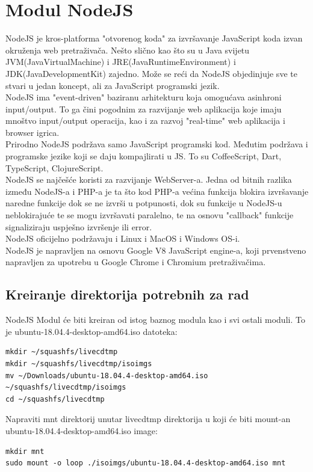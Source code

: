 \documentclass[12pt,vi]{mitthesis}
\begin{document}
\section*{Modul NodeJS}
\indent
NodeJS je kros-platforma "otvorenog koda" za izvršavanje JavaScript koda izvan okruženja web pretraživača. Nešto slično kao što su u Java svijetu JVM(JavaVirtualMachine) i JRE(JavaRuntimeEnvironment) i JDK(JavaDevelopmentKit) zajedno. Može se reći da NodeJS objedinjuje sve te stvari u jedan koncept, ali za JavaScript programski jezik.\\
NodeJS ima "event-driven" baziranu arhitekturu koja omogućava asinhroni input/output. To ga čini pogodnim za razvijanje web aplikacija koje imaju mnoštvo input/output operacija, kao i za razvoj "real-time" web aplikacija i browser igrica.\\
Prirodno NodeJS podržava samo JavaScript programski kod. Međutim podržava i programske jezike koji se daju kompajlirati u JS. To su CoffeeScript, Dart, TypeScript, ClojureScript.\\
NodeJS se najčešće koristi za razvijanje WebServer-a. Jedna od bitnih razlika između NodeJS-a i PHP-a je ta što kod PHP-a većina funkcija blokira izvršavanje naredne funkcije dok se ne izvrši u potpunosti, dok su funkcije u NodeJS-u neblokirajuće te se mogu izvršavati paralelno,  te na osnovu "callback" funkcije signaliziraju uspješno izvršenje ili error.\\
NodeJS oficijelno podržavaju i Linux i MacOS i Windows OS-i.\\
NodeJS je napravljen na osnovu Google V8 JavaScript engine-a, koji prvenstveno napravljen za upotrebu u Google Chrome i Chromium pretraživačima.

\subsection*{Kreiranje direktorija potrebnih za rad}
\noindent
NodeJS Modul će biti kreiran od istog baznog modula kao i svi ostali moduli. To je ubuntu-18.04.4-desktop-amd64.iso datoteka:
\begin{lstlisting}[style=BashInputStyle]
mkdir ~/squashfs/livecdtmp
mkdir ~/squashfs/livecdtmp/isoimgs
mv ~/Downloads/ubuntu-18.04.4-desktop-amd64.iso ~/squashfs/livecdtmp/isoimgs
cd ~/squashfs/livecdtmp
\end{lstlisting}

\noindent
Napraviti mnt direktorij unutar livecdtmp direktorija u koji će biti mount-an ubuntu-18.04.4-desktop-amd64.iso image:
\begin{lstlisting}[style=BashInputStyle]
mkdir mnt
sudo mount -o loop ./isoimgs/ubuntu-18.04.4-desktop-amd64.iso mnt
\end{lstlisting}
\end{document}
